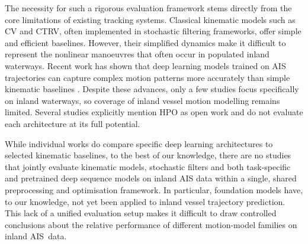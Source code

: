 The necessity for such a rigorous evaluation framework stems directly from the core limitations of existing tracking systems. %
Classical kinematic models such as \acf{CV} and \acf{CTRV}, often implemented in stochastic filtering frameworks, offer simple and efficient baselines.
However, their simplified dynamics make it difficult to represent the nonlinear manoeuvres that often occur in populated inland waterways. %
Recent work has shown that deep learning models trained on \ac{AIS} trajectories can capture complex motion patterns more accurately than simple kinematic baselines \parencite{donandt2022shortterm, Zhang22}. %
Despite these advances, 
only a few studies focus specifically on inland waterways, so coverage of inland vessel motion modelling remains limited. Several studies explicitly mention \acf{HPO} as open work and do not evaluate each architecture at its full potential. %


While individual works do compare specific deep learning architectures to selected kinematic baselines, to the best of our knowledge, there are no studies that jointly evaluate kinematic models, stochastic filters and both task-specific and pretrained deep sequence models on inland \ac{AIS} data within a single, shared preprocessing and optimisation framework.
In particular, foundation models have, to our knowledge, not yet been applied to inland vessel trajectory prediction.
This lack of a unified evaluation setup makes it difficult to draw controlled
conclusions about the relative performance of different motion-model families on inland \ac{AIS}\ data.

